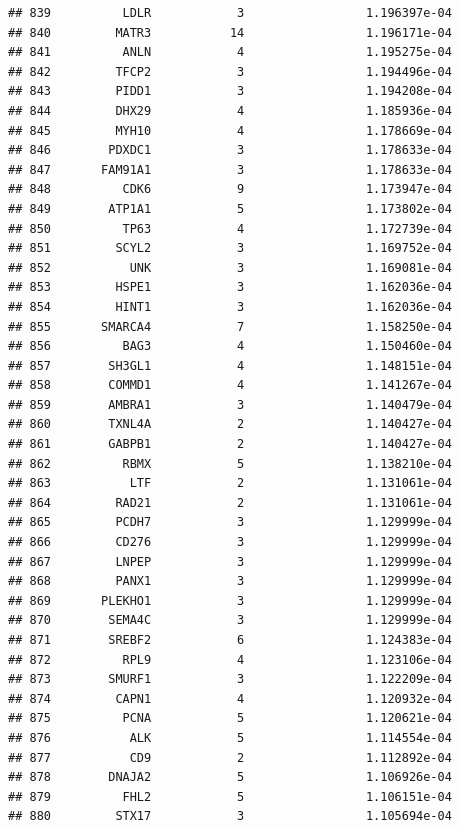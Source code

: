 \documentclass[
]{article}
\begin{document}
\begin{verbatim}
## 839          LDLR            3                 1.196397e-04
## 840         MATR3           14                 1.196171e-04
## 841          ANLN            4                 1.195275e-04
## 842         TFCP2            3                 1.194496e-04
## 843         PIDD1            3                 1.194208e-04
## 844         DHX29            4                 1.185936e-04
## 845         MYH10            4                 1.178669e-04
## 846        PDXDC1            3                 1.178633e-04
## 847       FAM91A1            3                 1.178633e-04
## 848          CDK6            9                 1.173947e-04
## 849        ATP1A1            5                 1.173802e-04
## 850          TP63            4                 1.172739e-04
## 851         SCYL2            3                 1.169752e-04
## 852           UNK            3                 1.169081e-04
## 853         HSPE1            3                 1.162036e-04
## 854         HINT1            3                 1.162036e-04
## 855       SMARCA4            7                 1.158250e-04
## 856          BAG3            4                 1.150460e-04
## 857        SH3GL1            4                 1.148151e-04
## 858        COMMD1            4                 1.141267e-04
## 859        AMBRA1            3                 1.140479e-04
## 860        TXNL4A            2                 1.140427e-04
## 861        GABPB1            2                 1.140427e-04
## 862          RBMX            5                 1.138210e-04
## 863           LTF            2                 1.131061e-04
## 864         RAD21            2                 1.131061e-04
## 865         PCDH7            3                 1.129999e-04
## 866         CD276            3                 1.129999e-04
## 867         LNPEP            3                 1.129999e-04
## 868         PANX1            3                 1.129999e-04
## 869       PLEKHO1            3                 1.129999e-04
## 870        SEMA4C            3                 1.129999e-04
## 871        SREBF2            6                 1.124383e-04
## 872          RPL9            4                 1.123106e-04
## 873        SMURF1            3                 1.122209e-04
## 874         CAPN1            4                 1.120932e-04
## 875          PCNA            5                 1.120621e-04
## 876           ALK            5                 1.114554e-04
## 877           CD9            2                 1.112892e-04
## 878        DNAJA2            5                 1.106926e-04
## 879          FHL2            5                 1.106151e-04
## 880         STX17            3                 1.105694e-04

\end{verbatim}
\end{document}

